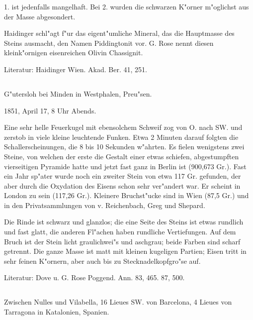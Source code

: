 \documentclass[a4paper, 11pt, oneside]{article}
\begin{document}
1. ist jedenfalls mangelhaft. Bei 2. wurden die schwarzen K"orner m"oglichst aus der Masse abgesondert.

Haidinger schl"agt f"ur das eigent"umliche Mineral, das die Hauptmasse des Steins ausmacht, den Namen Piddingtonit vor. G. Rose nennt diesen kleink"ornigen eisenreichen Olivin Chassignit.

\normalsize
Literatur: Haidinger Wien. Akad. Ber. 41, 251.

\subsection{}
\LARGE
\paragraph{}
G"utersloh bei Minden in Westphalen, Preu"sen.

1851, April 17, 8 Uhr Abends.

Eine sehr helle Feuerkugel mit ebensolchem Schweif zog von O. nach SW. und zerstob in viele kleine leuchtende Funken. Etwa 2 Minuten darauf folgten die Schallerscheinungen, die 8 bis 10 Sekunden w"ahrten. Es fielen wenigstens zwei Steine, von welchen der erste die Gestalt einer etwas schiefen, abgestumpften vierseitigen Pyramide hatte und jetzt fast ganz in Berlin ist (900,673 Gr.). Fast ein Jahr sp"ater wurde noch ein zweiter Stein von etwa 117 Gr. gefunden, der aber durch die Oxydation des Eisens schon sehr ver"andert war. Er scheint in London zu sein (117,26 Gr.). Kleinere Bruchst"ucke sind in Wien (87,5 Gr.) und in den Privatsammlungen von v. Reichenbach, Greg und Shepard.

Die Rinde ist schwarz und glanzlos; die eine Seite des Steins ist etwas rundlich und fast glatt, die anderen Fl"achen haben rundliche Vertiefungen. Auf dem Bruch ist der Stein licht graulichwei"s und aschgrau; beide Farben sind scharf getrennt. Die ganze Masse ist matt mit kleinen kugeligen Partien; Eisen tritt in sehr feinen K"ornern, aber auch bis zu Stecknadelkopfgro"se auf.

\normalsize
Literatur: Dove u. G. Rose Poggend. Ann. 83, 465. 87, 500.

\subsection{}
\LARGE
\paragraph{}
Zwischen Nulles und Vilabella, 16 Lieues SW. von Barcelona, 4 Lieues von Tarragona in Katalonien, Spanien.
\end{document}

